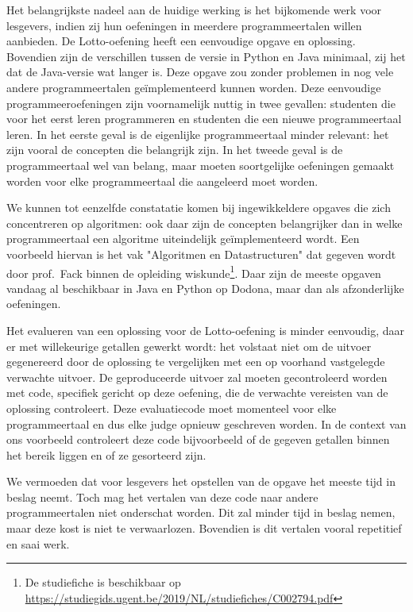 Het belangrijkste nadeel aan de huidige werking is het bijkomende werk voor lesgevers, indien zij hun oefeningen in meerdere programmeertalen willen aanbieden.
De Lotto-oefening heeft een eenvoudige opgave en oplossing.
Bovendien zijn de verschillen tussen de versie in Python en Java minimaal, zij het dat de Java-versie wat langer is.
Deze opgave zou zonder problemen in nog vele andere programmeertalen geïmplementeerd kunnen worden.
Deze eenvoudige programmeeroefeningen zijn voornamelijk nuttig in twee gevallen: studenten die voor het eerst leren programmeren en studenten die een nieuwe programmeertaal leren.
In het eerste geval is de eigenlijke programmeertaal minder relevant: het zijn vooral de concepten die belangrijk zijn.
In het tweede geval is de programmeertaal wel van belang, maar moeten soortgelijke oefeningen gemaakt worden voor elke programmeertaal die aangeleerd moet worden.

We kunnen tot eenzelfde constatatie komen bij ingewikkeldere opgaves die zich concentreren op algoritmen: ook daar zijn de concepten belangrijker dan in welke programmeertaal een algoritme uiteindelijk geïmplementeerd wordt.
Een voorbeeld hiervan is het vak "Algoritmen en Datastructuren" dat gegeven wordt door prof.\ Fack binnen de opleiding wiskunde\footnote{De studiefiche is beschikbaar op \url{https://studiegids.ugent.be/2019/NL/studiefiches/C002794.pdf}}.
Daar zijn de meeste opgaven vandaag al beschikbaar in Java en Python op Dodona, maar dan als afzonderlijke oefeningen.

Het evalueren van een oplossing voor de Lotto-oefening is minder eenvoudig, daar er met willekeurige getallen gewerkt wordt: het volstaat niet om de uitvoer gegenereerd door de oplossing te vergelijken met een op voorhand vastgelegde verwachte uitvoer.
De geproduceerde uitvoer zal moeten gecontroleerd worden met code, specifiek gericht op deze oefening, die de verwachte vereisten van de oplossing controleert.
Deze evaluatiecode moet momenteel voor elke programmeertaal en dus elke judge opnieuw geschreven worden.
In de context van ons voorbeeld controleert deze code bijvoorbeeld of de gegeven getallen binnen het bereik liggen en of ze gesorteerd zijn.

We vermoeden dat voor lesgevers het opstellen van de opgave het meeste tijd in beslag neemt.
Toch mag het vertalen van deze code naar andere programmeertalen niet onderschat worden.
Dit zal minder tijd in beslag nemen, maar deze kost is niet te verwaarlozen.
Bovendien is dit vertalen vooral repetitief en saai werk.

